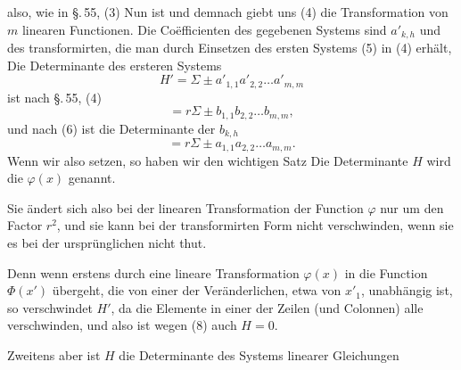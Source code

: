 also, wie in \S.\,55, (3)
Nun ist
und demnach giebt uns (4) die Transformation von $m$ linearen
Functionen. Die Co\"efficienten des gegebenen Systems sind $a'_{k,h}$
und des transformirten, die man durch Einsetzen des ersten
Systems (5) in (4) erh\"alt,
Die Determinante des ersteren Systems
\[
H' = \Sigma \pm a'_{1,1} a'_{2,2} \ldots a'_{m,m}
\]
ist nach \S.\,55, (4)
\[
= r \Sigma \pm b_{1,1} b_{2,2} \ldots b_{m,m},
\]
und nach (6) ist die Determinante der $b_{k,h}$
\[
= r \Sigma \pm a_{1,1} a_{2,2} \ldots a_{m,m}.
\]
Wenn wir also
setzen, so haben wir den wichtigen Satz
Die Determinante $H$ wird die 
$\varphi(x)$ genannt.

Sie \"andert sich also bei der linearen Transformation der
Function $\varphi$ nur um den Factor $r^2$, und sie kann bei der
transformirten Form nicht verschwinden, wenn sie es bei der
urspr\"unglichen nicht thut.


Denn wenn erstens durch eine lineare Transformation $\varphi(x)$
in die Function $\Phi(x')$ \"ubergeht, die von einer der Ver\"anderlichen,
etwa von $x'_1$, unabh\"angig ist, so verschwindet $H'$, da die Elemente
in einer der Zeilen (und Colonnen) alle verschwinden, und also
ist wegen (8) auch $H = 0$.

Zweitens aber ist $H$ die Determinante des Systems linearer
Gleichungen
